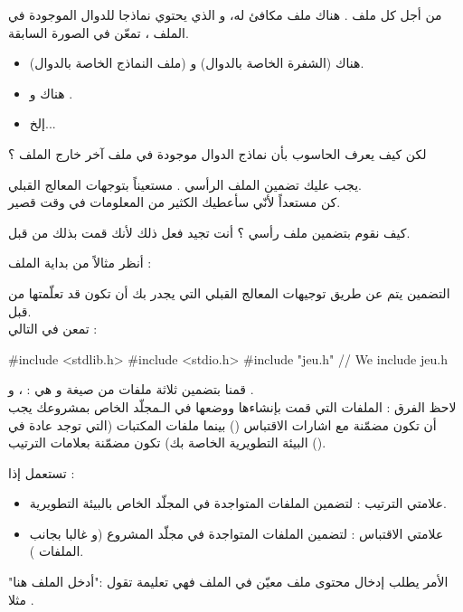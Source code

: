 من أجل كل ملف
.
هناك ملف مكافئ له، و الذي يحتوي نماذجا للدوال الموجودة في الملف
، تمعّن في الصورة السابقة.
\begin{itemize}
  \item هناك
(الشفرة الخاصة بالدوال) و
(ملف النماذج الخاصة بالدوال).
  \item هناك
و
.
  \item إلخ...
\end{itemize}
\begin{question}
  لكن كيف يعرف الحاسوب بأن نماذج الدوال موجودة في ملف آخر خارج الملف
؟
\end{question}
يجب عليك تضمين الملف الرأسي
.
مستعيناً بتوجهات المعالج القبلي.\\
كن مستعداً لأنّي سأعطيك الكثير من المعلومات في وقت قصير.

كيف نقوم بتضمين ملف رأسي ؟ أنت تجيد فعل ذلك لأنك قمت بذلك من قبل.

أنظر مثالاً من بداية الملف
 :
\begin{Csource}
#include <stdlib.h>
#include <stdio.h>
#include "jeu.h"
void play(SDL_Surface* screen)
{
// ...
\end{Csource}
التضمين يتم عن طريق توجيهات المعالج القبلي
التي يجدر بك أن تكون قد تعلّمتها من قبل.\\
تمعن في التالي :
\begin{Csource}
#include <stdlib.h>
#include <stdio.h>
#include "jeu.h" // We include jeu.h
\end{Csource}
قمنا بتضمين ثلاثة ملفات من صيغة
و هي :
،  و .\\
لاحظ الفرق : الملفات التي قمت بإنشاءها ووضعها في الـمجلّد الخاص بمشروعك يجب أن تكون مضمّنة مع اشارات الاقتباس
()
بينما ملفات المكتبات (التي توجد عادة في البيئة التطويرية الخاصة بك) تكون مضمّنة بعلامات الترتيب
().

تستعمل إذا :
\begin{itemize}
  \item علامتي الترتيب
\InlineCode{< >}
: لتضمين الملفات المتواجدة في المجلّد
الخاص بالبيئة التطويرية.
  \item علامتي الاقتباس
 : لتضمين  الملفات المتواجدة في مجلّد المشروع (و غالبا بجانب الملفات
).
\end{itemize}
الأمر
يطلب إدخال محتوى ملف معيّن في الملف
فهي تعليمة تقول :"أدخل الملف
هنا" مثلا .

